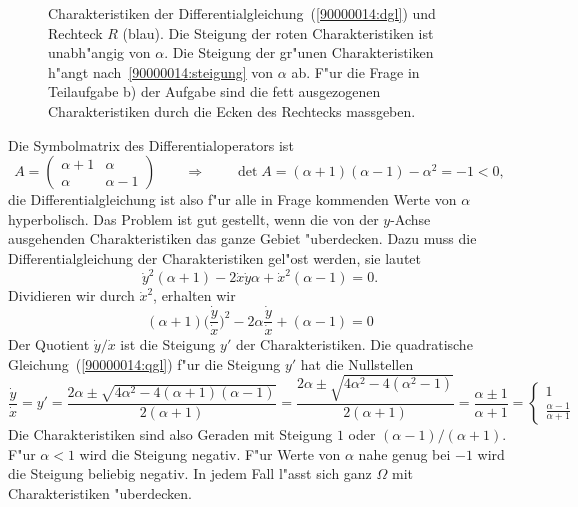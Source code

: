 \begin{loesung}
\begin{figure}
\centering
{}
\caption{Charakteristiken der Differentialgleichung~(\ref{90000014:dgl})
und Rechteck $R$ (blau). 
Die Steigung der roten Charakteristiken ist unabh"angig von $\alpha$.
Die Steigung der gr"unen Charakteristiken h"angt nach~\eqref{90000014:steigung}
von $\alpha$ ab.
F"ur die Frage in Teilaufgabe b) der Aufgabe sind die fett ausgezogenen
Charakteristiken durch die Ecken des Rechtecks massgeben.
\label{90000014:domain}}
\end{figure}
\begin{teilaufgaben}
\item
Die Symbolmatrix des Differentialoperators ist
\[
A=\begin{pmatrix}\alpha+1&\alpha \\ \alpha&\alpha - 1\end{pmatrix}
\qquad\Rightarrow\qquad
\det A=(\alpha + 1)(\alpha - 1) - \alpha^2=-1<0,
\]
die Differentialgleichung ist also f"ur alle in Frage kommenden
Werte von $\alpha$ hyperbolisch.
Das Problem ist gut gestellt, wenn die von der $y$-Achse ausgehenden
Charakteristiken das ganze Gebiet "uberdecken. 
Dazu muss die Differentialgleichung der Charakteristiken gel"ost werden,
sie lautet
\[
\dot y^2
(\alpha + 1)
-2
\dot x\dot y
\alpha
+
\dot x^2
(\alpha - 1)
=0.
\]
Dividieren wir durch $\dot x^2$, erhalten wir
\begin{equation}
(\alpha + 1)
\biggl(\frac{\dot y}{\dot x}\biggr)^2
-2\alpha \frac{\dot y}{\dot x} +(\alpha - 1)=0
\label{90000014:qgl}
\end{equation}
Der Quotient $\dot y/\dot x$ ist die Steigung $y'$ der Charakteristiken.
Die quadratische Gleichung~(\ref{90000014:qgl}) f"ur die Steigung $y'$
hat die Nullstellen
\begin{equation}
\frac{\dot y}{\dot x}=y'=
\frac{2\alpha \pm \sqrt{4\alpha^2 - 4(\alpha+1)(\alpha - 1)}}{2(\alpha +1)}
=
\frac{2\alpha \pm \sqrt{4\alpha^2 - 4(\alpha^2 - 1)}}{2(\alpha + 1)}
=
\frac{\alpha \pm 1}{\alpha + 1}
=
\begin{cases}
1&\\
\displaystyle\frac{\alpha - 1}{\alpha + 1}
\end{cases}
\label{90000014:steigung}
\end{equation}
Die Charakteristiken sind also Geraden mit Steigung $1$ oder
$(\alpha - 1)/(\alpha + 1)$.
F"ur $\alpha < 1$ wird die Steigung negativ.
F"ur Werte von $\alpha$ nahe genug bei $-1$ wird die Steigung beliebig
negativ.
In jedem Fall l"asst sich ganz $\Omega$ mit Charakteristiken "uberdecken.


\end{teilaufgaben}
\end{loesung}
